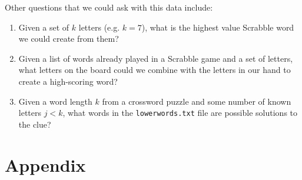 \documentclass[12pt]{article}
\begin{document}
Other questions that we could ask with this data include:
\begin{enumerate}
 \item Given a set of $k$ letters (e.g. $k=7$), what is the highest value Scrabble word we could create from them?
 \item Given a list of words already played in a Scrabble game and a set of letters, what letters on the board could we combine with the letters in our hand to create a high-scoring word?
 \item Given a word length $k$ from a crossword puzzle and some number of known letters $j<k$, what words in the \texttt{lowerwords.txt} file are possible solutions to the clue? 
 \end{enumerate} 

\pagebreak
\section*{Appendix}


\end{document}
